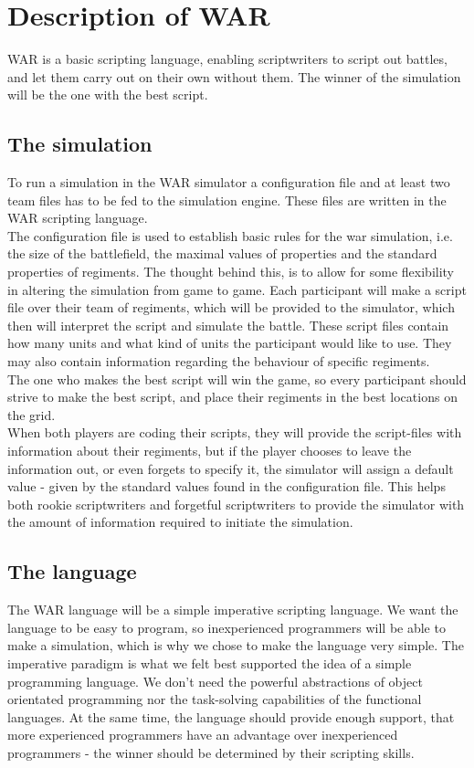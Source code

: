 
\section{ Description of WAR }
\label{sec:describeWAR}
WAR is a basic scripting language, enabling scriptwriters to script out battles, and let them carry out on their own without them. The winner of the simulation will be the one with the best script. \\
	\subsection{The simulation}
		To run a simulation in the WAR simulator a configuration file and at least two team files has to be fed to the simulation engine. 
		These files are written in the WAR scripting language.
		\\
		The configuration file is used to establish basic rules for the war simulation, i.e. the size of the battlefield, the maximal values of properties and the standard properties of regiments.
		The thought behind this, is to allow for some flexibility in altering the simulation from game to game.
		Each participant will make a script file over their team of regiments, which will be provided to the simulator, 
		which then will interpret the script and simulate the battle. 
		These script files contain how many units and what kind of units the participant would like to use. 
		They may also contain information regarding the behaviour of specific regiments. 
		\\
		The one who makes the best script will win the game, so every participant should strive to make the best script, 
		and place their regiments in the best locations on the grid.
		\\
		When both players are coding their scripts, they will provide the script-files with information about their regiments, 
		but if the player chooses to leave the information out, or even forgets to specify it, 
		the simulator will assign a default value - given by the standard values found in the configuration file. 
		This helps both rookie scriptwriters and forgetful scriptwriters to provide the simulator 
		with the amount of information required to initiate the simulation.

	\subsection{The language}
		The WAR language will be a simple imperative scripting language. 
		We want the language to be easy to program, so inexperienced programmers will be able to make a simulation, which is why we chose to
		make the language very simple. The imperative paradigm is what we felt best supported the idea of a simple programming language. We don't need the
		powerful abstractions of object orientated programming nor the task-solving capabilities of the functional languages. At the same time, the language should provide enough support, that more experienced programmers have an advantage over inexperienced programmers - the winner should be determined by their scripting skills.
		
